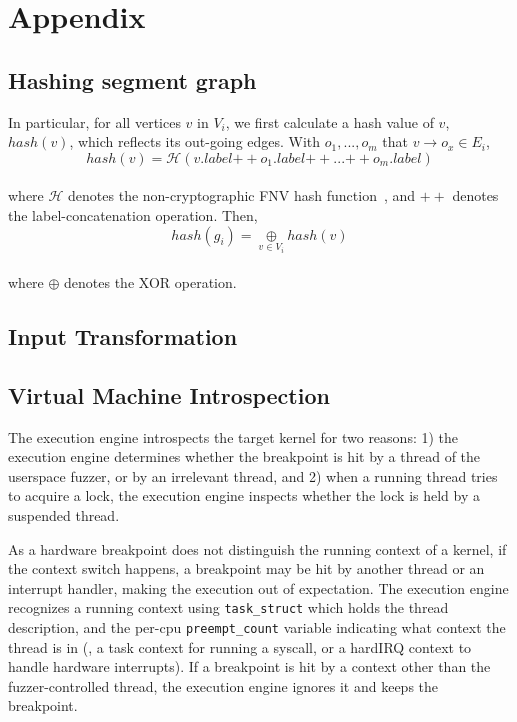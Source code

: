 \section{Appendix}


\subsection{Hashing segment graph}
\label{s:appendix:hash}
In particular, for all vertices $v$ in $V_i$, we first calculate a
hash value of $v$, $hash(v)$, which reflects its out-going edges. With
$o_1, ..., o_m$ that $v \rightarrow o_x \in E_i$,
%
%
\\[1pt]
\[
  hash(v) = \mathcal{H}(v.label {++} o_1.label {++} ... {++}
  o_m.label)
\]
\\[1pt]
%
where $\mathcal{H}$ denotes the
non-cryptographic FNV hash function~\cite{fnv, fnv-go}, and ${++}$
denotes the label-concatenation operation.
%
Then,
%
\\[1pt]
\[
  hash(g_i) = \underset{v \in V_i}{\oplus} hash(v)
\]
\\[1pt]
%
where $\oplus$ denotes the XOR operation.



\subsection{Input Transformation}
\label{s:appendix:inputtransform}



\subsection{Virtual Machine Introspection}
\label{s:appendix:vmi}

The execution engine introspects the target kernel for two reasons: 1)
the execution engine determines whether the breakpoint is hit by a
thread of the userspace fuzzer, or by an irrelevant thread, and 2)
when a running thread tries to acquire a lock, the execution engine
inspects whether the lock is held by a suspended thread.

As a hardware breakpoint does not distinguish the running context of a
kernel, if the context switch happens, a breakpoint may be hit by
another thread or an interrupt handler, making the execution out of
expectation.
%
The execution engine recognizes a running context using
\texttt{task_struct} which holds the thread description, and the
per-cpu \texttt{preempt_count} variable indicating what context the
thread is in (\eg, a task context for running a syscall, or a hardIRQ
context to handle hardware interrupts).
%
If a breakpoint is hit by a context other than the fuzzer-controlled
thread, the execution engine ignores it and keeps the breakpoint.


